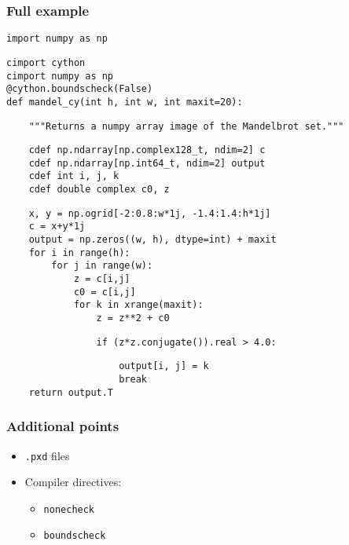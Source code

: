 \documentclass[14pt,compress]{beamer}
\newcommand{\typ}[1]{\lstinline{#1}}
\begin{document}
\begin{frame}
    \frametitle{Full example}
    \small
\begin{lstlisting}
import numpy as np
\end{lstlisting}
\begin{lstlisting}
cimport cython
cimport numpy as np
@cython.boundscheck(False)
def mandel_cy(int h, int w, int maxit=20):
\end{lstlisting}
\begin{lstlisting}
    """Returns a numpy array image of the Mandelbrot set."""
\end{lstlisting}
\begin{lstlisting}
    cdef np.ndarray[np.complex128_t, ndim=2] c
    cdef np.ndarray[np.int64_t, ndim=2] output
    cdef int i, j, k
    cdef double complex c0, z
\end{lstlisting}
\begin{lstlisting}
    x, y = np.ogrid[-2:0.8:w*1j, -1.4:1.4:h*1j]
    c = x+y*1j
    output = np.zeros((w, h), dtype=int) + maxit
    for i in range(h):
        for j in range(w):
            z = c[i,j]
            c0 = c[i,j]
            for k in xrange(maxit):
                z = z**2 + c0
\end{lstlisting}
\vspace*{-1em}
\begin{lstlisting}
                if (z*z.conjugate()).real > 4.0:
\end{lstlisting}
\vspace*{-1em}
\begin{lstlisting}
                    output[i, j] = k
                    break
    return output.T
\end{lstlisting}

\end{frame}


\begin{frame}
    \frametitle{Additional points}
    \begin{itemize}
        \item \typ{.pxd} files
        \item Compiler directives:
            \begin{itemize}
                \item \typ{nonecheck}
                \item \typ{boundscheck}
            \end{itemize}
    \end{itemize}
\end{frame}
\end{document}
